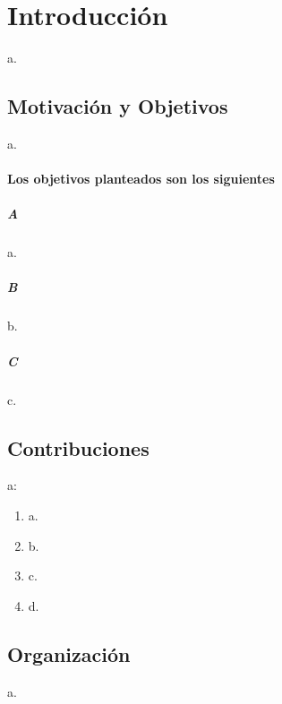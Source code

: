 \chapter{Introducci\'on}
\label{cap:introduccion}

a.    


\section{Motivaci\'on y Objetivos}
\label{sec:intro.objetivos}

a. 

\subsubsection*{Los objetivos planteados son los siguientes}

\paragraph{A}
a. 

\paragraph{B}
b.

\paragraph{C}
c.


\section{Contribuciones}
\label{sec:intro.contribuciones}


a:

\begin{enumerate}
	\item a.
	
	\item b.

    \item c.

    \item d. 
 
\end{enumerate}

\section{Organizaci\'on}
\label{sec:intro.organizacion}
a.


